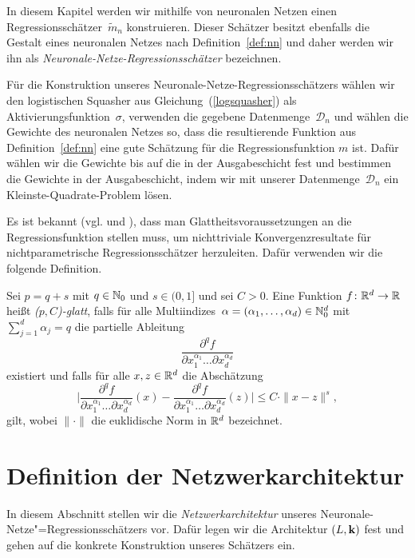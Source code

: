 In diesem Kapitel werden wir mithilfe von neuronalen Netzen einen Regressionsschätzer~$\tilde{m}_n$ konstruieren. Dieser Schätzer besitzt ebenfalls die Gestalt eines neuronalen Netzes nach Definition~\ref{def:nn} und daher werden wir ihn als \emph{Neuronale-Netze-Regressionsschätzer} bezeichnen. 


Für die Konstruktion unseres Neuronale-Netze-Regressionsschätzers wählen wir den logistischen Squasher aus Gleichung~(\ref{logsquasher}) als Aktivierungsfunktion~$\sigma$, verwenden die gegebene Datenmenge~$\mathcal{D}_n$ und wählen die Gewichte des neuronalen Netzes so, dass die resultierende Funktion aus Definition~\ref{def:nn} eine gute Schätzung für die Regressionsfunktion $m$ ist. Dafür wählen wir die Gewichte bis auf die in der Ausgabeschicht fest und bestimmen die Gewichte in der Ausgabeschicht, indem wir mit unserer Datenmenge~$\mathcal{D}_n$ ein Kleinste-Quadrate-Problem lösen.

Es ist bekannt (vgl.\@ \cite[Theorem 7.2 und Problem 7.2]{DevLug96} und \cite[Section 3]{DevWag80}), dass man Glattheitsvoraussetzungen an die Regressionsfunktion stellen muss, um nichttriviale Konvergenzresultate für nichtparametrische Regressionsschätzer herzuleiten. Dafür verwenden wir die folgende Definition.
\newpage
\begin{defn}[($p,C$)-Glattheit]
\label{def:pc}
   Sei $p = q + s$ mit $q \in \mathbb{N}_0$ und $s \in (0,1]$ und sei $C > 0$. Eine Funktion $f\colon \mathbb{R}^d \to \mathbb{R}$ heißt \emph{($p, C$)-glatt}, falls für alle Multiindizes~$\alpha = (\alpha_1,\dots,\alpha_d) \in \mathbb{N}_0^d$ mit $\sum_{j = 1}^{d}\alpha_j = q$ die partielle Ableitung 
   $$ \frac{\partial^qf}{\partial x_1^{\alpha_1}\dots\partial x_d^{\alpha_d}}$$
   existiert und falls für alle $x, z \in \mathbb{R}^d$ die Abschätzung 
   $$ \bigg|\frac{\partial^qf}{\partial x_1^{\alpha_1}\dots\partial x_d^{\alpha_d}}(x) - \frac{\partial^qf}{\partial x_1^{\alpha_1}\dots\partial x_d^{\alpha_d}}(z) \bigg| \leq C \cdot \|x - z\|^s,$$
   gilt, wobei $\|\cdot\|$ die euklidische Norm in $\mathbb{R}^d$ bezeichnet.  
\end{defn}

\section{Definition der Netzwerkarchitektur}
\label{subsec:2:1}
In diesem Abschnitt stellen wir die \emph{Netzwerkarchitektur} unseres Neuronale-Netze"=Regressionsschätzers vor. Dafür legen wir die Architektur $(L,\mathbf{k})$ fest und gehen auf die konkrete Konstruktion unseres Schätzers ein.

